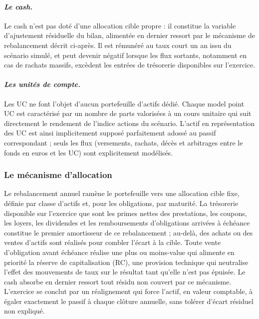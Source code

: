 \paragraph{\textit{Le cash.}} \hfill\break
Le cash n'est pas doté d'une allocation cible propre : il constitue la variable d'ajustement résiduelle du bilan, alimentée en dernier ressort par le mécanisme de rebalancement décrit ci-après. Il est rémunéré au taux court un an issu du scénario simulé, et peut devenir négatif lorsque les flux sortants, notamment en cas de rachats massifs, excèdent les entrées de trésorerie disponibles sur l'exercice.

\paragraph{\textit{Les unités de compte.}} \hfill\break
Les UC ne font l'objet d'aucun portefeuille d'actifs dédié. Chaque model point UC est caractérisé par un nombre de parts valorisées à un cours unitaire qui suit directement le rendement de l'indice actions du scénario. L'actif en représentation des UC est ainsi implicitement supposé parfaitement adossé au passif correspondant ; seuls les flux (versements, rachats, décès et arbitrages entre le fonds en euros et les UC) sont explicitement modélisés.

\subsubsection{Le mécanisme d'allocation}

Le rebalancement annuel ramène le portefeuille vers une allocation cible fixe, définie par classe d'actifs et, pour les obligations, par maturité. La trésorerie disponible sur l'exercice que sont les primes nettes des prestations, les coupons, les loyers, les dividendes et les remboursements d'obligations arrivées à échéance constitue le premier amortisseur de ce rebalancement ; au-delà, des achats ou des ventes d'actifs sont réalisés pour combler l'écart à la cible. Toute vente d'obligation avant échéance réalise une plus ou moins-value qui alimente en priorité la réserve de capitalisation (RC), une provision technique qui neutralise l'effet des mouvements de taux sur le résultat tant qu'elle n'est pas épuisée. Le cash absorbe en dernier ressort tout résidu non couvert par ce mécanisme. L'exercice se conclut par un réalignement qui force l'actif, en valeur comptable, à égaler exactement le passif à chaque clôture annuelle, sans tolérer d'écart résiduel non expliqué.

